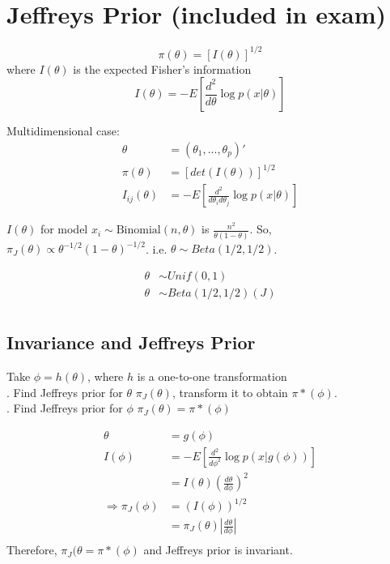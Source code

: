 \documentclass[12pt]{article}
\def\paren#1{\left(#1\right)}
\def\abs#1{\left|#1\right|}
\begin{document}
\section*{Jeffreys Prior (included in exam)}
\[
  \pi(\theta) = [I(\theta)]^{1/2} 
\]
where $I(\theta)$ is the expected Fisher's information
\[
  I(\theta) = -E[\frac{d^2}{d\theta}\log p(x|\theta)]
\]

\noindent
Multidimensional case:
\begin{align*}
  \theta &= (\theta_1,...,\theta_p)' \\
  \pi(\theta) &= [det(I(\theta))]^{1/2} \\
  I_{ij}(\theta) &= -E[\frac{d^2}{d\theta_i d\theta_j}\log p(x|\theta)]
\end{align*}

\noindent
$I(\theta)$ for model $x_i \sim \text{Binomial}(n,\theta)$ is $\frac{n^2}{\theta(1-\theta)}$. So, $\pi_J(\theta) \propto \theta^{-1/2}(1-\theta)^{-1/2}$. i.e. $\theta \sim Beta(1/2,1/2)$. 

\begin{align*}
  \theta &\sim Unif(0,1) \\
  \theta &\sim Beta(1/2,1/2)(J) \\
\end{align*}

\subsection*{Invariance and Jeffreys Prior}
Take $\phi = h(\theta)$, where $h$ is a one-to-one transformation \\
. Find Jeffreys prior for $\theta$ $\pi_J(\theta)$, transform it to obtain $\pi*(\phi)$.\\
. Find Jeffreys prior for $\phi$ $\pi_J(\theta) = \pi*(\phi)$ 

\begin{align*}
  \theta &= g(\phi)\\
  I(\phi) &= -E\left[\frac{d^2}{d\phi^2}\log p(x|g(\phi))\right] \\
          &= I(\theta) \paren{\frac{d\theta}{d\phi}}^2
  \\
  \Rightarrow \pi_J(\phi) &= \paren{I(\phi)}^{1/2} \\
                          &= \pi_J(\theta) \abs{\frac{d\theta}{d\phi}}\\
\end{align*}
Therefore, $\pi_J(\theta=\pi*(\phi)$ and Jeffreys prior is invariant.\\
\end{document}
